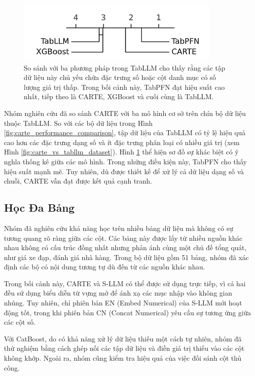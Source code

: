 \documentclass{article}
\begin{document}
\begin{figure} 
    \centering
    \includegraphics[scale = 0.8]{carte_baseline_comparision.png}
    \caption{So sánh với ba phương pháp trong TabLLM cho thấy rằng các tập dữ liệu này chủ yếu chứa đặc trưng số hoặc cột danh mục có số lượng giá trị thấp. Trong bối cảnh này, TabPFN đạt hiệu suất cao nhất, tiếp theo là CARTE, XGBoost và cuối cùng là TabLLM.}
    \label{fig:carte_baseline_comparision}
\end{figure}

Nhóm nghiên cứu đã so sánh CARTE với ba mô hình cơ sở trên chín bộ dữ liệu thuộc TabLLM. So với các bộ dữ liệu trong Hình \ref{fig:carte_performance_comparison}, tập dữ liệu của TabLLM có tỷ lệ hiệu quả cao hơn các đặc trưng dạng số và ít đặc trưng phân loại có nhiều giá trị (xem Hình \ref{fig:carte_vs_tabllm_dataset}). Hình \ref{fig:carte_baseline_comparision} thể hiện sơ đồ sự khác biệt có ý nghĩa thống kê giữa các mô hình. Trong những điều kiện này, TabPFN cho thấy hiệu suất mạnh mẽ. Tuy nhiên, dù được thiết kế để xử lý cả dữ liệu dạng số và chuỗi, CARTE vẫn đạt được kết quả cạnh tranh.

\subsection{Học Đa Bảng}
Nhóm đã nghiên cứu khả năng học trên nhiều bảng dữ liệu mà không có sự tương quang rõ ràng giữa các cột. Các bảng này được lấy từ nhiều nguồn khác nhau không có cấu trúc đồng nhất nhưng phản ánh cùng một chủ đề tổng quát, như giá xe đạp, đánh giá nhà hàng. Trong bộ dữ liệu gồm 51 bảng, nhóm đã xác định các bộ có nội dung tương tự dù đến từ các nguồn khác nhau.

Trong bối cảnh này, CARTE và S-LLM có thể được sử dụng trực tiếp, vì cả hai đều sử dụng biểu diễn từ vựng mở để ánh xạ các mục nhập vào không gian nhúng. Tuy nhiên, chỉ phiên bản EN (Embed Numerical) của S-LLM mới hoạt động tốt, trong khi phiên bản CN (Concat Numerical) yêu cầu sự tương ứng giữa các cột số.

Với CatBoost, do có khả năng xử lý dữ liệu thiếu một cách tự nhiên, nhóm đã thử nghiệm bằng cách ghép nối các tập dữ liệu và điền giá trị thiếu vào các cột không khớp. Ngoài ra, nhóm cũng kiểm tra hiệu quả của việc đối sánh cột thủ công.
\end{document}
